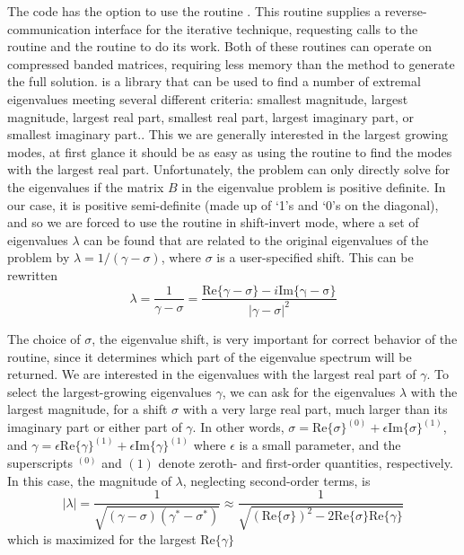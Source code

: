 \documentclass[letterpaper]{article}
\begin{document}
The code has the option to use the \verb@ARPACK@ routine
\verb@ZNAUPD@. This routine supplies a reverse-communication interface
for the iterative technique, requesting calls to the \verb@BLAS@
routine \verb@ZGBMV@ and the \verb@LAPACK@ routine \verb@ZGBTRS@ to do
its work. Both of these routines can operate on compressed banded
matrices, requiring less memory than the method to generate the full
solution. \verb@ARPACK@ is a library that can be used to find a number
of extremal eigenvalues meeting several different criteria: smallest
magnitude, largest magnitude, largest real part, smallest real part,
largest imaginary part, or smallest imaginary part.. This we are
generally interested in the largest growing modes, at first glance it
should be as easy as using the \verb@ARPACK@ routine to find the modes
with the largest real part. Unfortunately, the \verb@ZNAUPD@ problem
can only directly solve for the eigenvalues if the matrix $B$ in the
eigenvalue problem is positive definite. In our case, it is positive
semi-definite (made up of `1's and `0's on the diagonal), and so we
are forced to use the routine in shift-invert mode, where a set of
eigenvalues $\lambda$ can be found that are related to the original
eigenvalues of the problem by $\lambda = 1/(\gamma-\sigma)$, where
$\sigma$ is a user-specified shift. This can be rewritten
\begin{equation}
\lambda = \frac{1}{\gamma-\sigma} = \frac{\mathrm{Re}\{\gamma-\sigma\} 
                                          - i\mathrm{Im\{\gamma-\sigma\}}}
                                         {|\gamma-\sigma|^2}
\end{equation}

The choice of $\sigma$, the eigenvalue shift, is very important for
correct behavior of the \verb@ARPACK@ routine, since it determines
which part of the eigenvalue spectrum will be returned. We are
interested in the eigenvalues with the largest real part of $\gamma$.
To select the largest-growing eigenvalues $\gamma$, we can ask for the
eigenvalues $\lambda$ with the largest magnitude, for a shift $\sigma$
with a very large real part, much larger than its imaginary part or
either part of $\gamma$. In other words, $\sigma =
\mathrm{Re}\{\sigma\}^{(0)} + \epsilon\mathrm{Im}\{\sigma\}^{(1)}$,
and $\gamma = \epsilon\mathrm{Re}\{\gamma\}^{(1)} +
\epsilon\mathrm{Im}\{\gamma\}^{(1)}$ where $\epsilon$ is a small
parameter, and the superscripts $^{(0)}$ and ${(1)}$ denote zeroth-
and first-order quantities, respectively. In this case, the magnitude
of $\lambda$, neglecting second-order terms, is
\begin{equation}
|\lambda| = \frac{1}{\sqrt{\left(\gamma-\sigma\right)
                           \left(\gamma^*-\sigma^*\right)}}
\approx \frac{1}{\sqrt{\left(\mathrm{Re}\{\sigma\}\right)^2 
                       - 2\mathrm{Re}\{\sigma\}\mathrm{Re}\{\gamma\}}}
\end{equation}
which is maximized for the largest $\mathrm{Re}\{\gamma\}$
\end{document}
